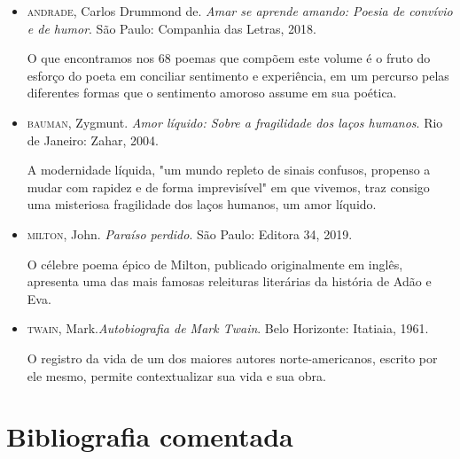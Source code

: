\documentclass{extarticle}
\begin{document}
\begin{itemize}
\item\textsc{andrade}, Carlos Drummond de. \textit{Amar se aprende amando: Poesia de
convívio e de humor}. São Paulo: Companhia das Letras, 2018.

O que encontramos nos 68 poemas que compõem este volume é o fruto do
esforço do poeta em conciliar sentimento e experiência, em um percurso
pelas diferentes formas que o sentimento amoroso assume em sua poética.

\item\textsc{bauman}, Zygmunt. \textit{Amor líquido: Sobre a fragilidade dos laços
humanos}. Rio de Janeiro: Zahar, 2004. 

A modernidade líquida, "um mundo repleto de sinais confusos, propenso a
mudar com rapidez e de forma imprevisível" em que vivemos, traz consigo
uma misteriosa fragilidade dos laços humanos, um amor líquido.

\item\textsc{milton}, John. \textit{Paraíso perdido}. São Paulo: Editora 34, 2019.

O célebre poema épico de Milton, publicado originalmente em inglês,
apresenta uma das mais famosas releituras literárias da história de Adão
e Eva.

\item\textsc{twain}, Mark.\textit{Autobiografia de Mark Twain}. Belo Horizonte:
Itatiaia, 1961.

O registro da vida de um dos maiores autores norte-americanos, escrito
por ele mesmo, permite contextualizar sua vida e sua obra.
\end{itemize}

\section{Bibliografia comentada}
\end{document}
